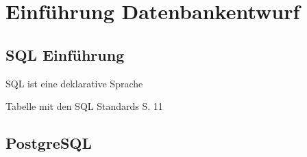 \documentclass[a4paper]{article}
\title{\docTitle}
\author{Moritz}
\date{\today}
\begin{document}
\maketitle
\tableofcontents


\section{Einführung Datenbankentwurf}

\subsection{SQL Einführung}

SQL ist eine deklarative Sprache


Tabelle mit den SQL Standards S. 11


\subsection{PostgreSQL}

\end{document}

